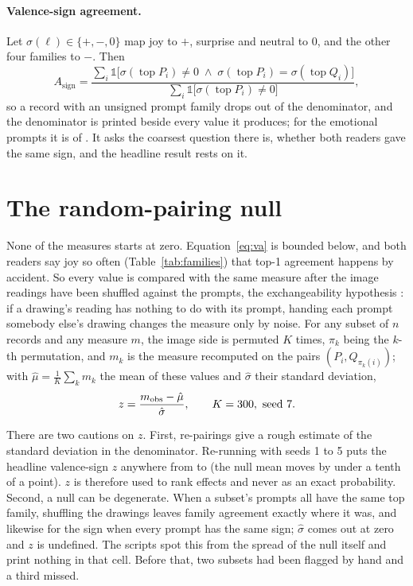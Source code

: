 \paragraph{Valence-sign agreement.} Let $\sigma(\ell) \in \{+, -, 0\}$ map joy to $+$, surprise and neutral to $0$, and the other four families to $-$. Then
\begin{equation}
A_{\mathrm{sign}} = \frac{\sum_{i} \mathbb{1}\bigl[\sigma(\operatorname{top} P_i) \neq 0 \;\wedge\; \sigma(\operatorname{top} P_i) = \sigma(\operatorname{top} Q_i)\bigr]}{\sum_{i} \mathbb{1}\bigl[\sigma(\operatorname{top} P_i) \neq 0\bigr]} ,
\label{eq:sign}
\end{equation}
so a record with an unsigned prompt family drops out of the denominator, and the denominator is printed beside every value it produces; for the emotional prompts it is \FullEmoNSign{} of \FullEmoN{}. It asks the coarsest question there is, whether both readers gave the same sign, and the headline result rests on it.

\section{The random-pairing null}
\label{sec:method-null}

None of the measures starts at zero. Equation~\ref{eq:va} is bounded below, and both readers say joy so often (Table~\ref{tab:families}) that top-1 agreement happens by accident. So every value is compared with the same measure after the image readings have been shuffled against the prompts, the exchangeability hypothesis \cite{good2005permutation}: if a drawing's reading has nothing to do with its prompt, handing each prompt somebody else's drawing changes the measure only by noise. For any subset of $n$ records and any measure $m$, the image side is permuted $K$ times, $\pi_k$ being the $k$-th permutation, and $m_k$ is the measure recomputed on the pairs $(P_i, Q_{\pi_k(i)})$; with $\hat\mu = \frac{1}{K}\sum_k m_k$ the mean of these values and $\hat\sigma$ their standard deviation,
\begin{equation}
z = \frac{m_{\mathrm{obs}} - \hat\mu}{\hat\sigma}, \qquad K = 300,\ \text{seed}\ 7 .
\label{eq:z}
\end{equation}

There are two cautions on $z$. First, \nullShuffles{} re-pairings give a rough estimate of the standard deviation in the denominator. Re-running with seeds 1 to 5 puts the headline valence-sign $z$ anywhere from \ZSeedMin{} to \ZSeedMax{} (the null mean moves by under a tenth of a point). $z$ is therefore used to rank effects and never as an exact probability. Second, a null can be degenerate. When a subset's prompts all have the same top family, shuffling the drawings leaves family agreement exactly where it was, and likewise for the sign when every prompt has the same sign; $\hat\sigma$ comes out at zero and $z$ is undefined. The scripts spot this from the spread of the null itself and print nothing in that cell. Before that, two subsets had been flagged by hand and a third missed.

